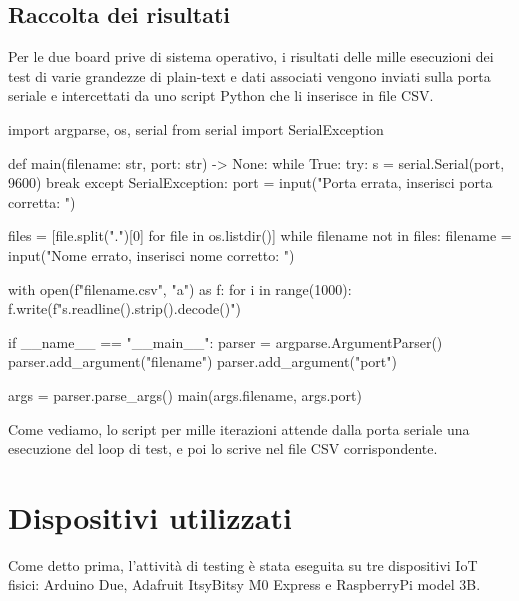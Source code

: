 \documentclass[12pt,a4paper,italian]{report}
\begin{document}
\subsection{Raccolta dei risultati}

Per le due board prive di sistema operativo, i risultati delle mille esecuzioni dei test di varie grandezze di plain-text e dati associati vengono inviati sulla porta seriale e intercettati da uno script Python che li inserisce in file CSV.

\begin{python}
import argparse, os, serial
from serial import SerialException


def main(filename: str, port: str) -> None:
    while True:
        try:
            s = serial.Serial(port, 9600)
            break
        except SerialException:
            port = input("Porta errata, inserisci porta corretta: ")

    files = [file.split(".")[0] for file in os.listdir()]
    while filename not in files:
        filename = input("Nome errato, inserisci nome corretto: ")

    with open(f"{filename}.csv", "a") as f:
        for i in range(1000):
            f.write(f"{s.readline().strip().decode()}\n")


if __name__ == "__main__":
    parser = argparse.ArgumentParser()
    parser.add_argument("filename")
    parser.add_argument("port")

    args = parser.parse_args()
    main(args.filename, args.port)
\end{python}

\noindent Come vediamo, lo script per mille iterazioni attende dalla porta seriale una esecuzione del loop di test, e poi lo scrive nel file CSV corrispondente.

\section{Dispositivi utilizzati}

Come detto prima, l'attività di testing è stata eseguita su tre dispositivi IoT fisici: Arduino Due, Adafruit ItsyBitsy M0 Express e RaspberryPi model 3B. \\
\end{document}
